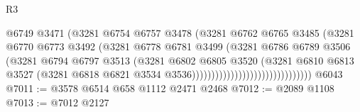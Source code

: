 \begin{lexlean}{R3}
\begin{coremodule}
                                                @6749
                                                @3471
                                                (@3281
                                                  @6754
                                                  @6757
                                                  @3478
                                                  (@3281
                                                    @6762
                                                    @6765
                                                    @3485
                                                    (@3281
                                                      @6770
                                                      @6773
                                                      @3492
                                                      (@3281
                                                        @6778
                                                        @6781
                                                        @3499
                                                        (@3281
                                                          @6786
                                                          @6789
                                                          @3506
                                                          (@3281
                                                            @6794
                                                            @6797
                                                            @3513
                                                            (@3281
                                                              @6802
                                                              @6805
                                                              @3520
                                                              (@3281
                                                                @6810
                                                                @6813
                                                                @3527
                                                                (@3281
                                                                  @6818
                                                                  @6821
                                                                  @3534
                                                                  @3536)))))))))))))))))))))))))))))))
    @6043
@7011 := @3578 @6514 @658 @1112 @2471 @2468
@7012 := @2089 @1108
@7013 := @7012 @2127

\end{coremodule}
\end{lexlean}
